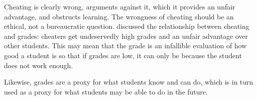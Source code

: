 Cheating is clearly wrong, arguments against it, which it provides an unfair advantage, and obstructs learning.
The wrongness of cheating should be an ethical, not a bureaucratic question.
 discussed the relationship between cheating and grades: cheaters get undeservedly high grades and an unfair advantage over other students.
This may mean that the grade is an infallible evaluation of how good a student is so that if grades are low, it can only be because the student does not work enough.

Likewise, grades are a proxy for what students know and can do, which is in turn used as a proxy for what students may be able to do in the future.
